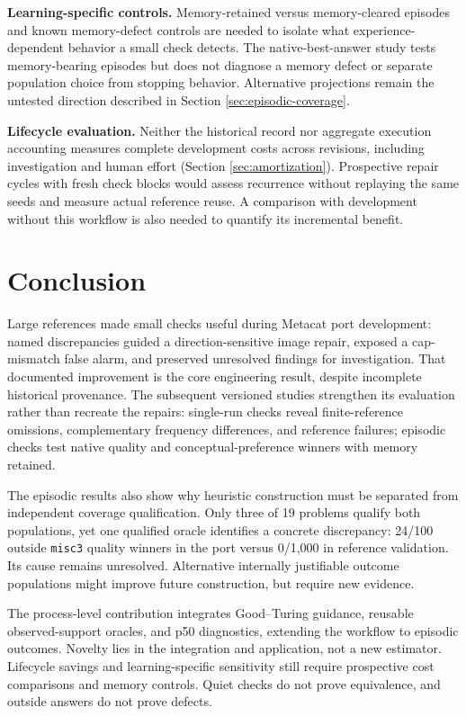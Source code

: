 \documentclass[10pt,letterpaper]{article}
\begin{document}
\textbf{Learning-specific controls.} Memory-retained versus memory-cleared episodes and
known memory-defect controls are needed to isolate what experience-dependent behavior a
small check detects. The native-best-answer study tests memory-bearing episodes but does
not diagnose a memory defect or separate population choice from stopping behavior.
Alternative projections remain the untested direction described in Section
\ref{sec:episodic-coverage}.

\textbf{Lifecycle evaluation.} Neither the historical record nor aggregate execution
accounting measures complete development costs across revisions, including investigation
and human effort (Section \ref{sec:amortization}). Prospective repair cycles with fresh
check blocks would assess recurrence without replaying the same seeds and measure actual
reference reuse. A comparison with development without this workflow is also needed to
quantify its incremental benefit.

\section{Conclusion}\label{sec:conclusion}

Large references made small checks useful during Metacat port development: named
discrepancies guided a direction-sensitive image repair, exposed a cap-mismatch false
alarm, and preserved unresolved findings for investigation. That documented improvement is
the core engineering result, despite incomplete historical provenance. The subsequent
versioned studies strengthen its evaluation rather than recreate the repairs: single-run
checks reveal finite-reference omissions, complementary frequency differences, and
reference failures; episodic checks test native quality and conceptual-preference winners
with memory retained.

The episodic results also show why heuristic construction must be separated from
independent coverage qualification. Only three of 19 problems qualify both populations,
yet one qualified oracle identifies a concrete discrepancy: 24/100 outside \texttt{misc3}
quality winners in the port versus 0/1,000 in reference validation. Its cause remains
unresolved. Alternative internally justifiable outcome populations might improve future
construction, but require new evidence.

The process-level contribution integrates Good--Turing guidance, reusable observed-support
oracles, and p50 diagnostics, extending the workflow to episodic outcomes. Novelty lies in
the integration and application, not a new estimator. Lifecycle savings and
learning-specific sensitivity still require prospective cost comparisons and memory
controls. Quiet checks do not prove equivalence, and outside answers do not prove defects.
\end{document}

